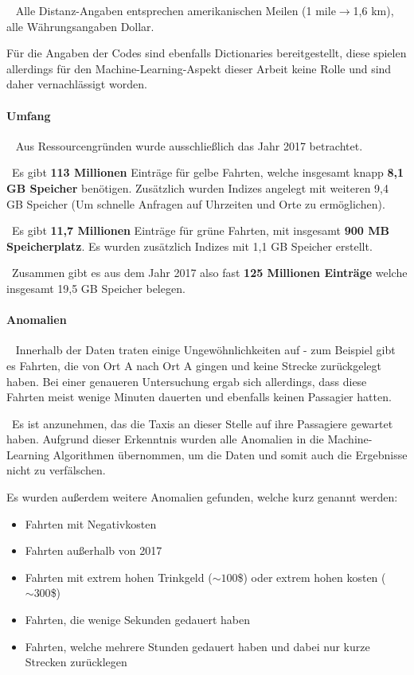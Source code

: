 ~\newline
Alle Distanz-Angaben entsprechen amerikanischen Meilen (1 mile$ \rightarrow $1,6 km), alle Währungsangaben Dollar. 

Für die Angaben der Codes sind ebenfalls Dictionaries bereitgestellt, diese spielen allerdings für den Machine-Learning-Aspekt dieser Arbeit keine Rolle und sind daher vernachlässigt worden. 
\paragraph{Umfang} ~\newline
Aus Ressourcengründen wurde ausschließlich das Jahr 2017 betrachtet. 

~\newline Es gibt \textbf{113 Millionen} Einträge für gelbe Fahrten, welche insgesamt knapp \textbf{8,1 GB Speicher} benötigen. Zusätzlich wurden Indizes angelegt mit weiteren 9,4 GB Speicher (Um schnelle Anfragen auf Uhrzeiten und Orte zu ermöglichen).

~\newline Es gibt \textbf{11,7 Millionen} Einträge für grüne Fahrten, mit insgesamt \textbf{900 MB Speicherplatz}. Es wurden zusätzlich Indizes mit 1,1 GB Speicher erstellt. 

~\newline Zusammen gibt es aus dem Jahr 2017 also fast \textbf{125 Millionen Einträge} welche insgesamt 19,5 GB Speicher belegen.
\paragraph{Anomalien} ~\newline
Innerhalb der Daten traten einige Ungewöhnlichkeiten auf - zum Beispiel gibt es Fahrten, die von Ort A nach Ort A gingen und keine Strecke zurückgelegt haben. Bei einer genaueren Untersuchung ergab sich allerdings, dass diese Fahrten meist wenige Minuten dauerten und ebenfalls keinen Passagier hatten. 

~\newline Es ist anzunehmen, das die Taxis an dieser Stelle auf ihre Passagiere gewartet haben. Aufgrund dieser Erkenntnis wurden alle Anomalien in die Machine-Learning Algorithmen übernommen, um die Daten und somit auch die Ergebnisse nicht zu verfälschen. 

Es wurden außerdem weitere Anomalien gefunden, welche kurz genannt werden:
\begin{itemize}
	\item Fahrten mit Negativkosten
	\item Fahrten außerhalb von 2017
	\item Fahrten mit extrem hohen Trinkgeld ($\sim 100$\$) oder extrem hohen kosten ($\sim300$\$)
	\item Fahrten, die wenige Sekunden gedauert haben
	\item Fahrten, welche mehrere Stunden gedauert haben und dabei nur kurze Strecken zurücklegen
\end{itemize}
